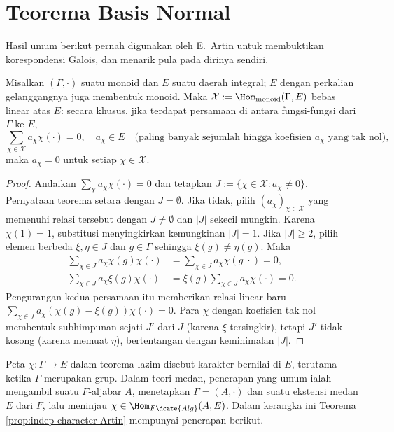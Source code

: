 \section{Teorema Basis Normal}
Hasil umum berikut pernah digunakan oleh E.\ Artin untuk membuktikan korespondensi Galois, dan menarik pula pada dirinya sendiri.
\begin{theorem}\label{prop:indep-character-Artin}
	Misalkan $(\Gamma, \cdot)$ suatu monoid dan $E$ suatu daerah integral; $E$ dengan perkalian gelanggangnya juga membentuk monoid. Maka $\mathcal{X} := \Hom_{\text{monoid}}(\Gamma, E)$ bebas linear atas $E$: secara khusus, jika terdapat persamaan di antara fungsi-fungsi dari $\Gamma$ ke $E$,
	\[ \sum_{\chi \in \mathcal{X}} a_\chi \chi(\cdot) = 0, \quad a_\chi \in E \quad \text{(paling banyak sejumlah hingga koefisien $a_\chi$ yang tak nol)}, \]
	maka $a_\chi=0$ untuk setiap $\chi\in\mathcal{X}$.
\end{theorem}
\begin{proof}
	Andaikan $\sum_\chi a_\chi \chi(\cdot) = 0$ dan tetapkan $J := \{\chi \in \mathcal{X}: a_\chi \neq 0\}$. Pernyataan teorema setara dengan $J = \emptyset$. Jika tidak, pilih $(a_\chi)_{\chi \in \mathcal{X}}$ yang memenuhi relasi tersebut dengan $J \neq \emptyset$ dan $|J|$ sekecil mungkin. Karena $\chi(1)=1$, substitusi menyingkirkan kemungkinan $|J|=1$. Jika $|J| \geq 2$, pilih elemen berbeda $\xi, \eta \in J$ dan $g \in \Gamma$ sehingga $\xi(g) \neq \eta(g)$. Maka
	\begin{align*}
		\sum_{\chi \in J} a_\chi \chi(g)\chi(\cdot) & = \sum_{\chi \in J}  a _\chi \chi(g\; \cdot) = 0, \\
		\sum_{\chi \in J} a_\chi \xi(g)\chi(\cdot) & = \xi(g) \sum_{\chi \in J}  a_\chi \chi(\cdot) = 0.
	\end{align*}
	Pengurangan kedua persamaan itu memberikan relasi linear baru $\sum_{\chi \in J} a_\chi(\chi(g) - \xi(g)) \chi(\cdot)=0$. Para $\chi$ dengan koefisien tak nol membentuk subhimpunan sejati $J'$ dari $J$ (karena $\xi$ tersingkir), tetapi $J'$ tidak kosong (karena memuat $\eta$), bertentangan dengan keminimalan $|J|$.
\end{proof}
Peta $\chi:\Gamma\to E$ dalam teorema lazim disebut karakter bernilai di $E$, terutama ketika $\Gamma$ merupakan grup. Dalam teori medan, penerapan yang umum ialah mengambil suatu $F$-aljabar $A$, menetapkan $\Gamma=(A,\cdot)$ dan suatu ekstensi medan $E$ dari $F$, lalu meninjau $\chi \in \Hom_{F\dcate{Alg}}(A,E)$. Dalam kerangka ini Teorema \ref{prop:indep-character-Artin} mempunyai penerapan berikut.

